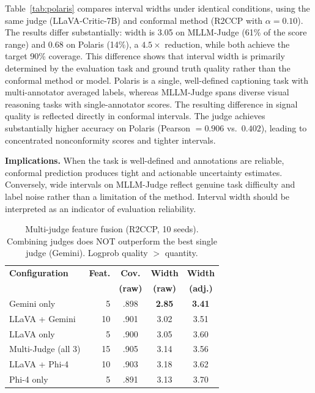 \documentclass{article}
\begin{document}
Table~\ref{tab:polaris} compares interval widths under identical conditions, using the same judge (LLaVA-Critic-7B) and conformal method (R2CCP with $\alpha = 0.10$). The results differ substantially: width is 3.05 on MLLM-Judge (61\% of the score range) and 0.68 on Polaris (14\%), a $4.5\times$ reduction, while both achieve the target 90\% coverage. This difference shows that interval width is primarily determined by the evaluation task and ground truth quality rather than the conformal method or model. Polaris is a single, well-defined captioning task with multi-annotator averaged labels, whereas MLLM-Judge spans diverse visual reasoning tasks with single-annotator scores. The resulting difference in signal quality is reflected directly in conformal intervals. The judge achieves substantially higher accuracy on Polaris (Pearson $= 0.906$ vs.\ $0.402$), leading to concentrated nonconformity scores and tighter intervals.

\textbf{Implications.}
When the task is well-defined and annotations are reliable, conformal prediction produces tight and actionable uncertainty estimates. Conversely, wide intervals on MLLM-Judge reflect genuine task difficulty and label noise rather than a limitation of the method. Interval width should be interpreted as an indicator of evaluation reliability.

\begin{table}[t]
\centering
\caption{Multi-judge feature fusion (R2CCP, 10 seeds). Combining judges does NOT outperform the best single judge (Gemini). Logprob quality $>$ quantity.}
\label{tab:multijudge}
\small
\begin{tabular}{lrccc}
\toprule
\textbf{Configuration} & \textbf{Feat.} & \textbf{Cov.} & \textbf{Width} & \textbf{Width} \\
& & \textbf{(raw)} & \textbf{(raw)} & \textbf{(adj.)} \\
\midrule
Gemini only & 5 & .898 & \textbf{2.85} & \textbf{3.41} \\
LLaVA + Gemini & 10 & .901 & 3.02 & 3.51 \\
LLaVA only & 5 & .900 & 3.05 & 3.60 \\
Multi-Judge (all 3) & 15 & .905 & 3.14 & 3.56 \\
LLaVA + Phi-4 & 10 & .903 & 3.18 & 3.62 \\
Phi-4 only & 5 & .891 & 3.13 & 3.70 \\
\bottomrule
\end{tabular}
\end{table}
\end{document}
